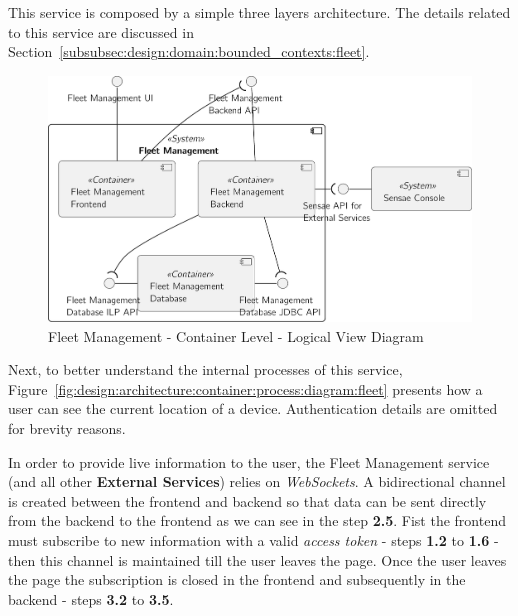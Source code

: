 This service is composed by a simple three layers architecture. The details related to this service are discussed in Section~\ref{subsubsec:design:domain:bounded_contexts:fleet}.

\begin{figure}[H]
   \centering
   \includegraphics[page=1,width=0.75\columnwidth]{assets/diagrams/design/architectural/level2/logical/fleet-management-context.pdf}
   \caption[Fleet Management - Container Level - Logical View Diagram]{Fleet Management - Container Level - Logical View Diagram}
   \label{fig:design:architecture:solutions:containers:logical:fleet}
\end{figure}

Next, to better understand the internal processes of this service, Figure~\ref{fig:design:architecture:container:process:diagram:fleet} presents how a user can see the current location of a device. Authentication details are omitted for brevity reasons.

In order to provide live information to the user, the Fleet Management service (and all other \textbf{External Services}) relies on \textit{WebSockets}. A bidirectional channel is created between the frontend and backend so that data can be sent directly from the backend to the frontend as we can see in the step \textbf{2.5}. Fist the frontend must subscribe to new information with a valid \textit{access token} - steps \textbf{1.2} to \textbf{1.6} - then this channel is maintained till the user leaves the page. Once the user leaves the page the subscription is closed in the frontend and subsequently in the backend - steps \textbf{3.2} to \textbf{3.5}.

